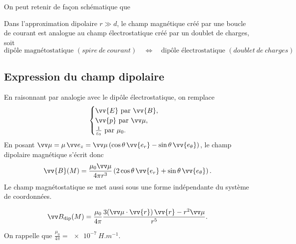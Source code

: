 \documentclass[12pt,fancy]{cours}
\begin{document}

On peut retenir de façon schématique que
\begin{prop}\label{prop:}
  Dans l'approximation dipolaire $r \gg d$, le champ magnétique créé par une boucle de courant est analogue au champ électrostatique créé par un doublet de charges, soit
\begin{equation*}
\text{dipôle magnétostatique } (spire~de~courant)\quad\Leftrightarrow\quad \text{dipôle électrostatique } (doublet~de~charges)
\end{equation*}
\end{prop}



\subsection{Expression du champ dipolaire}

En raisonnant par analogie avec le dipôle électrostatique, on remplace
\begin{equation}
\begin{cases}
\vv{E}\text{ par }\vv{B},\\
\vv{p}\text{ par }\M,\\
\frac{1}{\varepsilon_0}\text{ par }\mu_0.
\end{cases}
\end{equation}
En posant $\M=\mu\,\ez=\M\,(\cos\theta\,\vv{e_r}-\sin\theta\,\vv{e_\theta})$, le champ dipolaire magnétique s'écrit donc
\begin{equation}
\label{eq:champ_E_dipolaire}
\vv{B}(M)=\frac{\mu_0 \M}{4\pi r^3} \left(2\cos\theta\,\vv{e_r}+\sin\theta\,\vv{e_\theta}\right).
\end{equation}
Le champ magnétostatique se met aussi sous une forme indépendante du système de coordonnées.
\begin{theorem}
\begin{equation}
\B_{\rm dip}(M)=\frac{\mu_0}{4\pi}\frac{3(\M\cdot\vv{r})\,\vv{r}-r^2\M}{r^5}.
\end{equation}
\end{theorem}
On rappelle que $\frac{\mu_0}{4\pi} = \SI{e-7}{H.m^{-1}}$.
\end{document}
